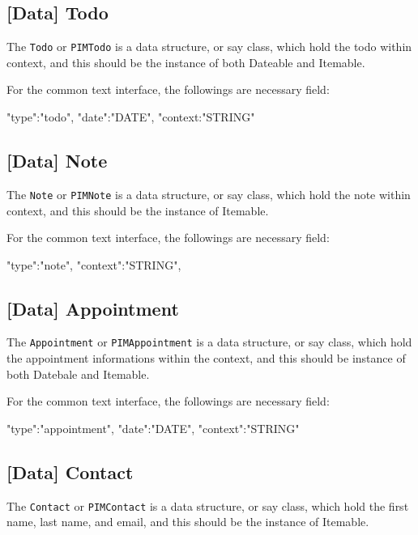 \documentclass{article}
\begin{document}
    \subsection{[Data] Todo}
    The \lstinline|Todo| or \lstinline|PIMTodo| is a data structure, or say class, which hold the todo within context,
    and this should be the instance of both Dateable and Itemable.
    
    For the common text interface, the followings are necessary field: 
    \begin{json}
 {
     "type":"todo",
     "date":"{DATE}",
     "context:"{STRING}"
 }
    \end{json} 
    
    \subsection{[Data] Note}
    The \lstinline|Note| or \lstinline|PIMNote| is a data structure, or say class, which hold the note within context,
    and this should be the instance of Itemable.
    
    For the common text interface, the followings are necessary field: 
    \begin{json}
 {
     "type":"note",
     "context":"{STRING}",
 }
    \end{json}
    
    \subsection{[Data] Appointment}
    The \lstinline|Appointment| or \lstinline|PIMAppointment| is a data structure, or say class,
    which hold the appointment informations within the context, and this should be instance of both Datebale and Itemable.
    
    For the common text interface, the followings are necessary field: 
    \begin{json}
 {
     "type":"appointment",
     "date":"{DATE}",
     "context":"{STRING}"
 }
    \end{json}
    
    \subsection{[Data] Contact}
    The \lstinline|Contact| or \lstinline|PIMContact| is a data structure, or say class, which hold the first name, last name,
    and email, and this should be the instance of Itemable.
    
\end{document}
